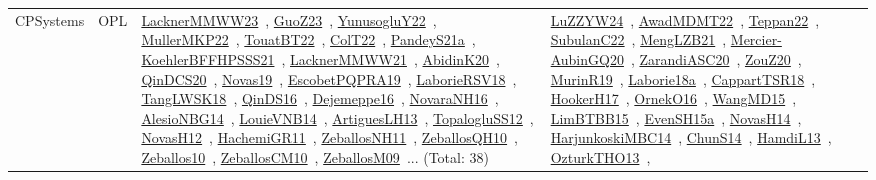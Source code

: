 {\begin{longtable}{lp{3cm}>{\raggedright\arraybackslash}p{6cm}>{\raggedright\arraybackslash}p{6cm}>{\raggedright\arraybackslash}p{8cm}}
\index{OPL}\index{CPSystems!OPL}CPSystems & OPL & \href{../works/LacknerMMWW23.pdf}{LacknerMMWW23}~\cite{LacknerMMWW23}, \href{../works/GuoZ23.pdf}{GuoZ23}~\cite{GuoZ23}, \href{../works/YunusogluY22.pdf}{YunusogluY22}~\cite{YunusogluY22}, \href{../works/MullerMKP22.pdf}{MullerMKP22}~\cite{MullerMKP22}, \href{../works/TouatBT22.pdf}{TouatBT22}~\cite{TouatBT22}, \href{../works/ColT22.pdf}{ColT22}~\cite{ColT22}, \href{../works/PandeyS21a.pdf}{PandeyS21a}~\cite{PandeyS21a}, \href{../works/KoehlerBFFHPSSS21.pdf}{KoehlerBFFHPSSS21}~\cite{KoehlerBFFHPSSS21}, \href{../works/LacknerMMWW21.pdf}{LacknerMMWW21}~\cite{LacknerMMWW21}, \href{../works/AbidinK20.pdf}{AbidinK20}~\cite{AbidinK20}, \href{../works/QinDCS20.pdf}{QinDCS20}~\cite{QinDCS20}, \href{../works/Novas19.pdf}{Novas19}~\cite{Novas19}, \href{../works/EscobetPQPRA19.pdf}{EscobetPQPRA19}~\cite{EscobetPQPRA19}, \href{../works/LaborieRSV18.pdf}{LaborieRSV18}~\cite{LaborieRSV18}, \href{../works/TangLWSK18.pdf}{TangLWSK18}~\cite{TangLWSK18}, \href{../works/QinDS16.pdf}{QinDS16}~\cite{QinDS16}, \href{../works/Dejemeppe16.pdf}{Dejemeppe16}~\cite{Dejemeppe16}, \href{../works/NovaraNH16.pdf}{NovaraNH16}~\cite{NovaraNH16}, \href{../works/AlesioNBG14.pdf}{AlesioNBG14}~\cite{AlesioNBG14}, \href{../works/LouieVNB14.pdf}{LouieVNB14}~\cite{LouieVNB14}, \href{../works/ArtiguesLH13.pdf}{ArtiguesLH13}~\cite{ArtiguesLH13}, \href{../works/TopalogluSS12.pdf}{TopalogluSS12}~\cite{TopalogluSS12}, \href{../works/NovasH12.pdf}{NovasH12}~\cite{NovasH12}, \href{../works/HachemiGR11.pdf}{HachemiGR11}~\cite{HachemiGR11}, \href{../works/ZeballosNH11.pdf}{ZeballosNH11}~\cite{ZeballosNH11}, \href{../works/ZeballosQH10.pdf}{ZeballosQH10}~\cite{ZeballosQH10}, \href{../works/Zeballos10.pdf}{Zeballos10}~\cite{Zeballos10}, \href{../works/ZeballosCM10.pdf}{ZeballosCM10}~\cite{ZeballosCM10}, \href{../works/ZeballosM09.pdf}{ZeballosM09}~\cite{ZeballosM09}... (Total: 38) & \href{../works/LuZZYW24.pdf}{LuZZYW24}~\cite{LuZZYW24}, \href{../works/AwadMDMT22.pdf}{AwadMDMT22}~\cite{AwadMDMT22}, \href{../works/Teppan22.pdf}{Teppan22}~\cite{Teppan22}, \href{../works/SubulanC22.pdf}{SubulanC22}~\cite{SubulanC22}, \href{../works/MengLZB21.pdf}{MengLZB21}~\cite{MengLZB21}, \href{../works/Mercier-AubinGQ20.pdf}{Mercier-AubinGQ20}~\cite{Mercier-AubinGQ20}, \href{../works/ZarandiASC20.pdf}{ZarandiASC20}~\cite{ZarandiASC20}, \href{../works/ZouZ20.pdf}{ZouZ20}~\cite{ZouZ20}, \href{../works/MurinR19.pdf}{MurinR19}~\cite{MurinR19}, \href{../works/Laborie18a.pdf}{Laborie18a}~\cite{Laborie18a}, \href{../works/CappartTSR18.pdf}{CappartTSR18}~\cite{CappartTSR18}, \href{../works/HookerH17.pdf}{HookerH17}~\cite{HookerH17}, \href{../works/OrnekO16.pdf}{OrnekO16}~\cite{OrnekO16}, \href{../works/WangMD15.pdf}{WangMD15}~\cite{WangMD15}, \href{../works/LimBTBB15.pdf}{LimBTBB15}~\cite{LimBTBB15}, \href{../works/EvenSH15a.pdf}{EvenSH15a}~\cite{EvenSH15a}, \href{../works/NovasH14.pdf}{NovasH14}~\cite{NovasH14}, \href{../works/HarjunkoskiMBC14.pdf}{HarjunkoskiMBC14}~\cite{HarjunkoskiMBC14}, \href{../works/ChunS14.pdf}{ChunS14}~\cite{ChunS14}, \href{../works/HamdiL13.pdf}{HamdiL13}~\cite{HamdiL13}, \href{../works/OzturkTHO13.pdf}{OzturkTHO13}~\cite{OzturkTHO13}, 
\end{longtable}}
